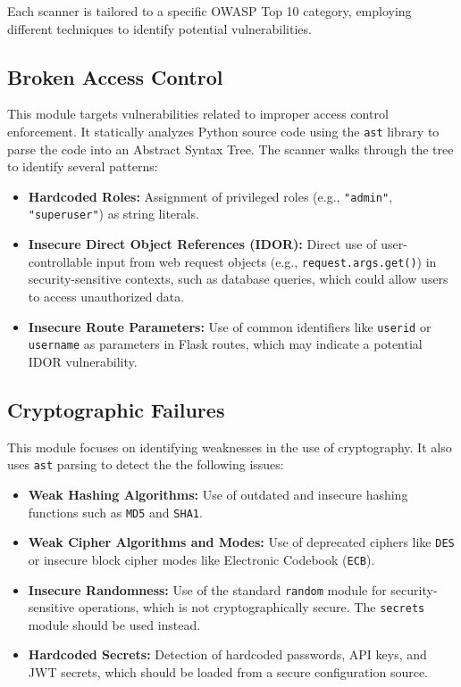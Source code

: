 Each scanner is tailored to a specific OWASP Top 10 category, employing different techniques to identify potential vulnerabilities. 

\subsection{Broken Access Control}
This module targets vulnerabilities related to improper access control enforcement. It statically analyzes Python source code using the \texttt{ast} library to parse the code into an Abstract Syntax Tree. The scanner walks through the tree to identify several patterns:
\begin{itemize}
    \item \textbf{Hardcoded Roles:} Assignment of privileged roles (e.g., \texttt{"admin"}, \texttt{"superuser"}) as string literals.
    \item \textbf{Insecure Direct Object References (IDOR):} Direct use of user-controllable input from web request objects (e.g., \texttt{request.args.get()}) in security-sensitive contexts, such as database queries, which could allow users to access unauthorized data.
    \item \textbf{Insecure Route Parameters:} Use of common identifiers like \texttt{userid} or \texttt{username} as parameters in Flask routes, which may indicate a potential IDOR vulnerability.
\end{itemize}

\subsection{Cryptographic Failures}
This module focuses on identifying weaknesses in the use of cryptography. It also uses \texttt{ast} parsing to detect the the following issues:
\begin{itemize}
    \item \textbf{Weak Hashing Algorithms:} Use of outdated and insecure hashing functions such as \texttt{MD5} and \texttt{SHA1}.
    \item \textbf{Weak Cipher Algorithms and Modes:} Use of deprecated ciphers like \texttt{DES} or insecure block cipher modes like Electronic Codebook (\texttt{ECB}).
    \item \textbf{Insecure Randomness:} Use of the standard \texttt{random} module for security-sensitive operations, which is not cryptographically secure. The \texttt{secrets} module should be used instead.
    \item \textbf{Hardcoded Secrets:} Detection of hardcoded passwords, API keys, and JWT secrets, which should be loaded from a secure configuration source.
\end{itemize}

